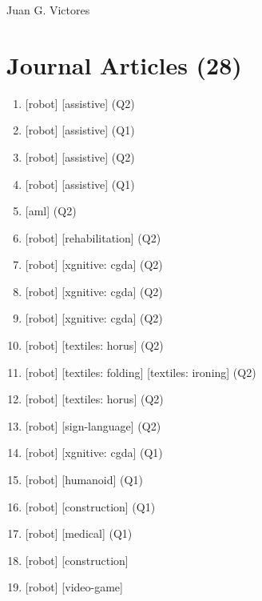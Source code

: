 \documentclass{article}
\def\name{Juan G. Victores}
\begin{document}
{\huge \name}

\vspace{0.2in}



\section*{Journal Articles (28)}
\begin{enumerate}
  \item {} [robot] [assistive] (Q2)
  \item {} [robot] [assistive] (Q1)
  \item {} [robot] [assistive] (Q2)
  \item {} [robot] [assistive] (Q1)
  \item {} [aml] (Q2)
  \item {} [robot] [rehabilitation] (Q2)
  \item {} [robot] [xgnitive: cgda] (Q2)
  \item {} [robot] [xgnitive: cgda] (Q2)
  \item {} [robot] [xgnitive: cgda] (Q2)
  \item {} [robot] [textiles: horus] (Q2)
  \item {} [robot] [textiles: folding] [textiles: ironing] (Q2)
  \item {} [robot] [textiles: horus] (Q2)
  \item {} [robot] [sign-language] (Q2)
  \item {} [robot] [xgnitive: cgda] (Q1)
  \item {} [robot] [humanoid] (Q1)
  \item {} [robot] [construction] (Q1)
  \item {} [robot] [medical] (Q1)
  \item {} [robot] [construction]
  \item {} [robot] [video-game]

\end{enumerate}
\end{document}
